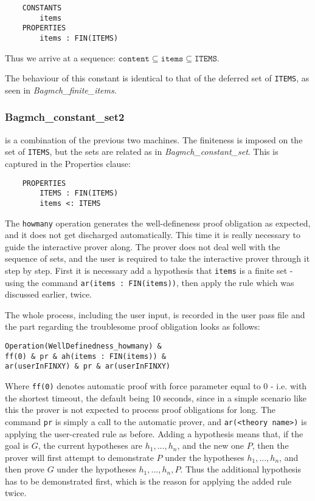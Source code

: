 \documentclass[11pt,journal]{IEEEtran}
\begin{document}
	\begin{lstlisting}
	CONSTANTS
		items
	PROPERTIES
		items : FIN(ITEMS)
	\end{lstlisting}
	Thus we arrive at a sequence: $\texttt{content} \subseteq \texttt{items} \subseteq \texttt{ITEMS}$.
	
	The behaviour of this constant is identical to that of the deferred set of \texttt{ITEMS}, as seen in \emph{Bagmch\_finite\_items}.
	
	\subsubsection{Bagmch\_constant\_set2} is a combination of the previous two machines. The finiteness is imposed on the set of \texttt{ITEMS}, but the sets are related as in \emph{Bagmch\_constant\_set}. This is captured in the Properties clause:
	\begin{lstlisting}
	PROPERTIES
		ITEMS : FIN(ITEMS)
		items <: ITEMS 
	\end{lstlisting}
	The \texttt{howmany} operation generates the well-defineness proof obligation as expected, and it does not get discharged automatically. This time it is really necessary to guide the interactive prover along. The prover does not deal well with the sequence of sets, and the user is required to take the interactive prover through it step by step. First it is necessary add a hypothesis that \texttt{items} is a finite set - using the command \texttt{ar(items : FIN(items))}, then apply the rule which was discussed earlier, twice. 
	
	The whole process, including the user input, is recorded in the user pass file and the part regarding the troublesome proof obligation looks as follows:
	
	\begin{lstlisting}
Operation(WellDefinedness_howmany) & 
ff(0) & pr & ah(items : FIN(items)) &
ar(userInFINXY) & pr & ar(userInFINXY)
	\end{lstlisting}
	Where \texttt{ff(0)} denotes automatic proof with force parameter equal to 0 - i.e. with the shortest timeout, the default being 10 seconds, since in a simple scenario like this the prover is not expected to process proof obligations for long. The command \texttt{pr} is simply a call to the automatic prover, and \texttt{ar(<theory name>)} is applying the user-created rule as before. Adding a hypothesis means that, if the goal is $G$, the current hypotheses are $h_1, ..., h_n$, and the new one $P$, then the prover will first attempt to demonstrate $P$ under the hypotheses $h_1, ..., h_n$, and then prove $G$ under the hypotheses $h_1, ...,h_n, P$.\cite{PO reference}  Thus the additional hypothesis has to be demonstrated first, which is the reason for applying the added rule twice. 
	
\end{document}
